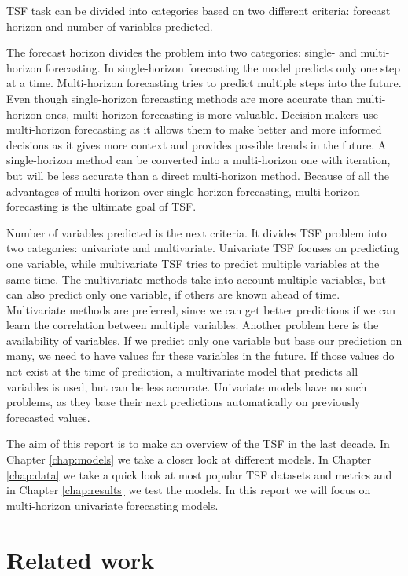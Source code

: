 \documentclass[conference]{IEEEtran}
\begin{document}
TSF task can be divided into categories based on two different criteria: forecast horizon and number of variables predicted.

The forecast horizon divides the problem into two categories: single- and multi-horizon forecasting.
In single-horizon forecasting the model predicts only one step at a time.
Multi-horizon forecasting tries to predict multiple steps into the future.
Even though single-horizon forecasting methods are more accurate than multi-horizon ones, multi-horizon forecasting is more valuable.
Decision makers use multi-horizon forecasting as it allows them to make better and more informed decisions as it gives more context and provides possible trends in the future.
A single-horizon method can be converted into a multi-horizon one with iteration, but will be less accurate than a direct multi-horizon method.
Because of all the advantages of multi-horizon over single-horizon forecasting, multi-horizon forecasting is the ultimate goal of TSF.

Number of variables predicted is the next criteria.
It divides TSF problem into two categories: univariate and multivariate.
Univariate TSF focuses on predicting one variable, while multivariate TSF tries to predict multiple variables at the same time.
The multivariate methods take into account multiple variables, but can also predict only one variable, if others are known ahead of time.
Multivariate methods are preferred, since we can get better predictions if we can learn the correlation between multiple variables.
Another problem here is the availability of variables.
If we predict only one variable but base our prediction on many, we need to have values for these variables in the future.
If those values do not exist at the time of prediction, a multivariate model that predicts all variables is used, but can be less accurate.
Univariate models have no such problems, as they base their next predictions automatically on previously forecasted values.

The aim of this report is to make an overview of the TSF in the last decade. In Chapter \ref{chap:models} we take a closer look at different models. In Chapter \ref{chap:data} we take a quick look at most popular TSF datasets and metrics and in Chapter \ref{chap:results} we test the models.
In this report we will focus on multi-horizon univariate forecasting models.

\section{Related work}
\label{chap:related}
\end{document}
